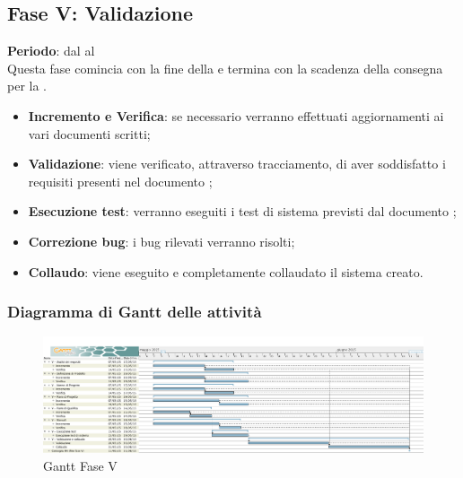 \subsection{Fase V: Validazione}
	\textbf{Periodo}: dal  al  \\Questa fase comincia con la fine della  e termina con la scadenza della consegna per la .
	\begin{itemize}
		\item \textbf{Incremento e Verifica}: se necessario verranno effettuati aggiornamenti ai vari documenti scritti;
		\item \textbf{Validazione}: viene verificato, attraverso tracciamento, di aver soddisfatto i requisiti presenti nel documento ;
		\item \textbf{Esecuzione test}: verranno eseguiti i test di sistema previsti dal documento ;
		\item \textbf{Correzione bug}: i bug rilevati verranno risolti;
		\item \textbf{Collaudo}: viene eseguito e completamente collaudato il sistema creato.
	\end{itemize}
	\subsubsection{Diagramma di Gantt delle attività}
		\begin{figure}[H]\centering
			\includegraphics[width=\textwidth]{PianoDiProgetto/Pics/FaseV.png}
		\caption{Gantt Fase V}
\end{figure}
